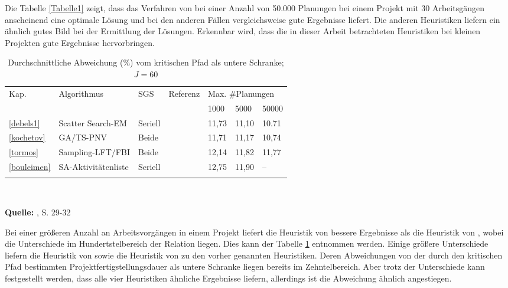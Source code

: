 \documentclass[a4paper,12pt,normalheadings,footexclude,headinclude,liststotoc,nochapterprefix,onecolumn,oneside,parskip,pointlessnumbers]{scrreprt}
\begin{document}
Die Tabelle \ref{Tabelle1} zeigt, dass das Verfahren von \cite{kochetov2003evolutionary} bei einer Anzahl von 50.000 Planungen bei einem Projekt mit 30 Arbeitsgängen anscheinend eine optimale Lösung und bei den anderen Fällen vergleichsweise gute Ergebnisse liefert. Die anderen Heuristiken liefern ein ähnlich gutes Bild bei der Ermittlung der Lösungen. Erkennbar wird, dass die in dieser Arbeit betrachteten Heuristiken bei kleinen Projekten gute Ergebnisse hervorbringen.

\begin{table}[h!]
  \begin{center}
    \caption{Durchschnittliche Abweichung (\%) vom kritischen Pfad als untere Schranke; $J=60$}  
    \begin{small} 
    \label{Tabelle2}
    \vspace*{3mm}
    \begin{tabular}{lllllll}   %
Kap.   &    Algorithmus					& SGS		& Referenz	& \multicolumn{3}{l}{Max. \#Planungen}\\ 
           	&					&                	&           		& 1000	& 5000 & 50000	   \\ \hline
	\ref{debels1}&	Scatter Search-EM & Seriell                &      \citeauthor{debels2006hybrid}     	& 11,73	& 11,10 & 10.71	   \\
\ref{kochetov}&	GA/TS-PNV & Beide                &      \citeauthor{kochetov2003evolutionary}     	& 11,71	& 11,17 & 10,74	   \\
	\ref{tormos}&	Sampling-LFT/FBI & Beide                &      \citeauthor{tormos2003efficient}     	& 12,14	& 11,82 & 11,77	   \\
		\ref{bouleimen}&	SA-Aktivitätenliste & Seriell                &      \citeauthor{bouleimen2003new}     	& 12,75 	& 11,90 & --	   \\
			\\ 
    \end{tabular} \\[3mm]
  \end{small} 
    {\footnotesize \textbf{Quelle:} \cite{kolisch2006experimental}, S. 29-32}   
  \end{center}
\end{table}

Bei einer größeren Anzahl an Arbeitsvorgängen in einem Projekt liefert die Heuristik von \cite{debels2006hybrid} bessere Ergebnisse als die Heuristik von \cite{kochetov2003evolutionary}, wobei die Unterschiede im Hundertstelbereich der Relation liegen. Dies kann der Tabelle \ref{Tabelle2} entnommen werden. Einige größere Unterschiede liefern die Heuristik von \cite{tormos2003efficient} sowie die Heuristik von \cite{bouleimen2003new} zu den vorher genannten Heuristiken. Deren Abweichungen von der durch den kritischen Pfad bestimmten Projektfertigstellungsdauer als untere Schranke liegen bereits im Zehntelbereich. Aber trotz der Unterschiede kann festgestellt werden, dass alle vier Heuristiken ähnliche Ergebnisse liefern, allerdings ist die Abweichung ähnlich angestiegen.
\end{document}
